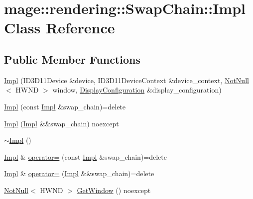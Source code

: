 \hypertarget{classmage_1_1rendering_1_1_swap_chain_1_1_impl}{}\section{mage\+:\+:rendering\+:\+:Swap\+Chain\+:\+:Impl Class Reference}
\label{classmage_1_1rendering_1_1_swap_chain_1_1_impl}
\subsection*{Public Member Functions}
\begin{DoxyCompactItemize}
\item 
\hyperlink{classmage_1_1rendering_1_1_swap_chain_1_1_impl_a9631b95d63626a41575ca18aa6dec206}{Impl} (I\+D3\+D11\+Device \&device, I\+D3\+D11\+Device\+Context \&device\+\_\+context, \hyperlink{namespacemage_a8769f9d670d6b585ea306cb1062af94b}{Not\+Null}$<$ H\+W\+ND $>$ window, \hyperlink{classmage_1_1rendering_1_1_display_configuration}{Display\+Configuration} \&display\+\_\+configuration)
\item 
\hyperlink{classmage_1_1rendering_1_1_swap_chain_1_1_impl_a3e356f1260f5a0c63ef5623547720bc9}{Impl} (const \hyperlink{classmage_1_1rendering_1_1_swap_chain_1_1_impl}{Impl} \&swap\+\_\+chain)=delete
\item 
\hyperlink{classmage_1_1rendering_1_1_swap_chain_1_1_impl_aed29d0cdb54323cd670e5a690faed394}{Impl} (\hyperlink{classmage_1_1rendering_1_1_swap_chain_1_1_impl}{Impl} \&\&swap\+\_\+chain) noexcept
\item 
\hyperlink{classmage_1_1rendering_1_1_swap_chain_1_1_impl_ac41af1d1c99d284152447381045c169b}{$\sim$\+Impl} ()
\item 
\hyperlink{classmage_1_1rendering_1_1_swap_chain_1_1_impl}{Impl} \& \hyperlink{classmage_1_1rendering_1_1_swap_chain_1_1_impl_aabec221c1f9b95b5b8001823914e65b8}{operator=} (const \hyperlink{classmage_1_1rendering_1_1_swap_chain_1_1_impl}{Impl} \&swap\+\_\+chain)=delete
\item 
\hyperlink{classmage_1_1rendering_1_1_swap_chain_1_1_impl}{Impl} \& \hyperlink{classmage_1_1rendering_1_1_swap_chain_1_1_impl_a4a1fe13cc2fa4e40a2616aa1d8698912}{operator=} (\hyperlink{classmage_1_1rendering_1_1_swap_chain_1_1_impl}{Impl} \&\&swap\+\_\+chain)=delete
\item 
\hyperlink{namespacemage_a8769f9d670d6b585ea306cb1062af94b}{Not\+Null}$<$ H\+W\+ND $>$ \hyperlink{classmage_1_1rendering_1_1_swap_chain_1_1_impl_a58ee8003efb4b792d6e6315a1a691b5c}{Get\+Window} () noexcept

\end{DoxyCompactItemize}
